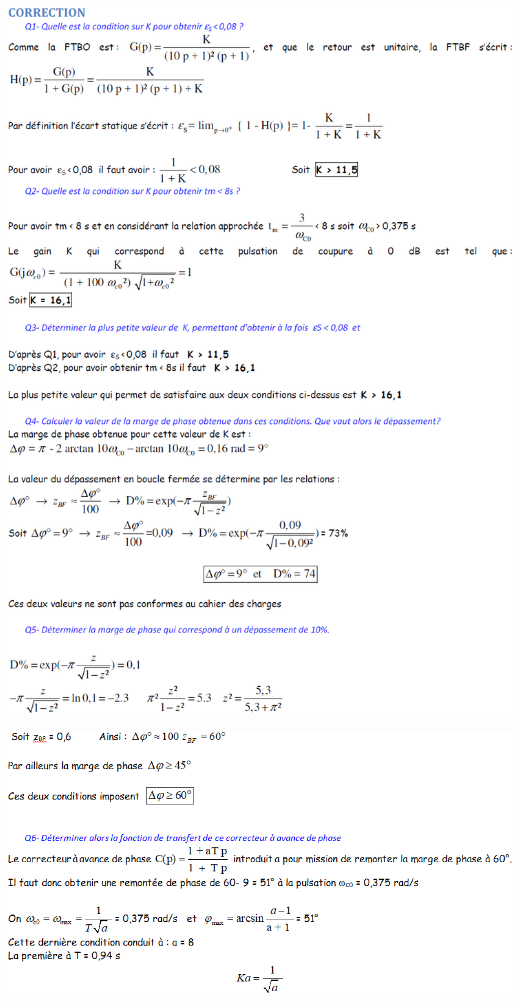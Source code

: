 \documentclass[10pt,fleqn]{article} %
\begin{document}
\newpage
\begin{center}
\includegraphics[width=\linewidth]{images/cor_01}

\includegraphics[width=\linewidth]{images/cor_02}
\end{center}
\end{document}
